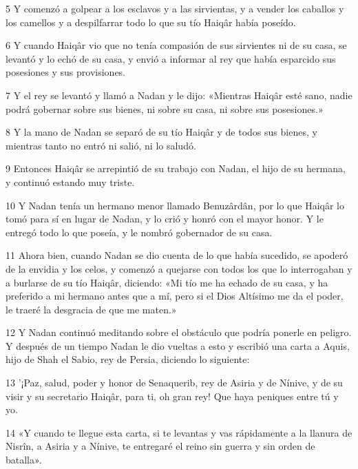 \par 5 Y comenzó a golpear a los esclavos y a las sirvientas, y a vender los caballos y los camellos y a despilfarrar todo lo que su tío Haiqâr había poseído.

\par 6 Y cuando Haiqâr vio que no tenía compasión de sus sirvientes ni de su casa, se levantó y lo echó de su casa, y envió a informar al rey que había esparcido sus posesiones y sus provisiones.

\par 7 Y el rey se levantó y llamó a Nadan y le dijo: «Mientras Haiqâr esté sano, nadie podrá gobernar sobre sus bienes, ni sobre su casa, ni sobre sus posesiones.»

\par 8 Y la mano de Nadan se separó de su tío Haiqâr y de todos sus bienes, y mientras tanto no entró ni salió, ni lo saludó.

\par 9 Entonces Haiqâr se arrepintió de su trabajo con Nadan, el hijo de su hermana, y continuó estando muy triste.

\par 10 Y Nadan tenía un hermano menor llamado Benuzârdân, por lo que Haiqâr lo tomó para sí en lugar de Nadan, y lo crió y honró con el mayor honor. Y le entregó todo lo que poseía, y le nombró gobernador de su casa.

\par 11 Ahora bien, cuando Nadan se dio cuenta de lo que había sucedido, se apoderó de la envidia y los celos, y comenzó a quejarse con todos los que lo interrogaban y a burlarse de su tío Haiqâr, diciendo: «Mi tío me ha echado de su casa, y ha preferido a mi hermano antes que a mí, pero si el Dios Altísimo me da el poder, le traeré la desgracia de que me maten.»

\par 12 Y Nadan continuó meditando sobre el obstáculo que podría ponerle en peligro. Y después de un tiempo Nadan le dio vueltas a esto y escribió una carta a Aquis, hijo de Shah el Sabio, rey de Persia, diciendo lo siguiente:

\par 13 '¡Paz, salud, poder y honor de Senaquerib, rey de Asiria y de Nínive, y de su visir y su secretario Haiqâr, para ti, oh gran rey! Que haya peniques entre tú y yo.

\par 14 «Y cuando te llegue esta carta, si te levantas y vas rápidamente a la llanura de Nisrîn, a Asiria y a Nínive, te entregaré el reino sin guerra y sin orden de batalla».

